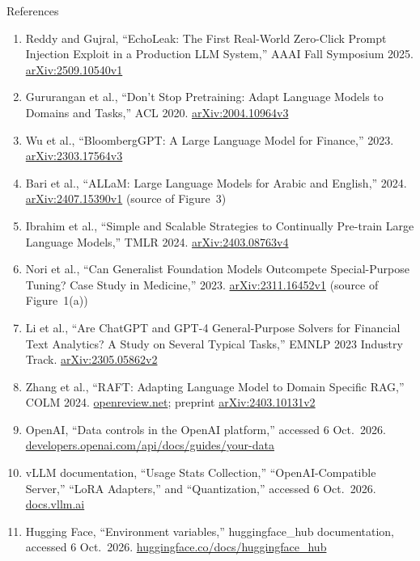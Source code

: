 \begin{frame}[allowframebreaks]{References}
\begin{enumerate}
    \item Reddy and Gujral, ``EchoLeak: The First Real-World Zero-Click Prompt Injection Exploit in a Production LLM System,'' AAAI Fall Symposium 2025. \href{https://arxiv.org/abs/2509.10540v1}{arXiv:2509.10540v1}
    \item Gururangan et al., ``Don't Stop Pretraining: Adapt Language Models to Domains and Tasks,'' ACL 2020. \href{https://arxiv.org/abs/2004.10964v3}{arXiv:2004.10964v3}
    \item Wu et al., ``BloombergGPT: A Large Language Model for Finance,'' 2023. \href{https://arxiv.org/abs/2303.17564v3}{arXiv:2303.17564v3}
    \item Bari et al., ``ALLaM: Large Language Models for Arabic and English,'' 2024. \href{https://arxiv.org/abs/2407.15390v1}{arXiv:2407.15390v1} (source of Figure~3)
    \item Ibrahim et al., ``Simple and Scalable Strategies to Continually Pre-train Large Language Models,'' TMLR 2024. \href{https://arxiv.org/abs/2403.08763v4}{arXiv:2403.08763v4}
    \item Nori et al., ``Can Generalist Foundation Models Outcompete Special-Purpose Tuning? Case Study in Medicine,'' 2023. \href{https://arxiv.org/abs/2311.16452v1}{arXiv:2311.16452v1} (source of Figure~1(a))
    \item Li et al., ``Are ChatGPT and GPT-4 General-Purpose Solvers for Financial Text Analytics? A Study on Several Typical Tasks,'' EMNLP 2023 Industry Track. \href{https://arxiv.org/abs/2305.05862v2}{arXiv:2305.05862v2}
    \item Zhang et al., ``RAFT: Adapting Language Model to Domain Specific RAG,'' COLM 2024. \href{https://openreview.net/forum?id=rzQGHXNReU}{openreview.net}; preprint \href{https://arxiv.org/abs/2403.10131v2}{arXiv:2403.10131v2}
    \item OpenAI, ``Data controls in the OpenAI platform,'' accessed 6 Oct.\ 2026. \href{https://developers.openai.com/api/docs/guides/your-data}{developers.openai.com/api/docs/guides/your-data}
    \item vLLM documentation, ``Usage Stats Collection,'' ``OpenAI-Compatible Server,'' ``LoRA Adapters,'' and ``Quantization,'' accessed 6 Oct.\ 2026. \href{https://docs.vllm.ai/en/latest/}{docs.vllm.ai}
    \item Hugging Face, ``Environment variables,'' huggingface\_hub documentation, accessed 6 Oct.\ 2026. \href{https://huggingface.co/docs/huggingface_hub/package_reference/environment_variables}{huggingface.co/docs/huggingface\_hub}

\end{enumerate}
\end{frame}
